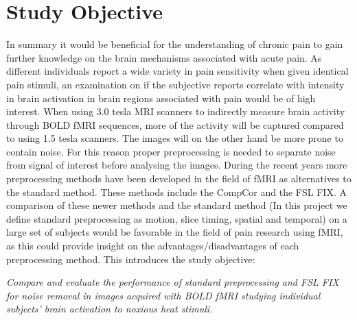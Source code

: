 \chapter{Study Objective}

In summary it would be beneficial for the understanding of chronic pain to gain further knowledge on the brain mechanisms associated with acute pain. As different individuals report a wide variety in pain sensitivity when given identical pain stimuli, an examination on if the subjective reports correlate with intensity in brain activation in brain regions associated with pain would be of high interest. When using 3.0 tesla MRI scanners to indirectly measure brain activity through BOLD fMRI sequences, more of the activity will be captured compared to using 1.5 tesla scanners. The images will on the other hand be more prone to contain noise. For this reason proper preprocessing is needed to separate noise from signal of interest before analysing the images. During the recent years more preprocessing methods have been developed in the field of fMRI as alternatives to the standard method. These methods include the CompCor and the FSL FIX. A comparison of these newer methods and the standard method (In this project we define standard preprocessing as motion, slice timing, spatial and temporal) on a large set of subjects would be favorable in the field of pain research using fMRI, as this could provide insight on the advantages/disadvantages of each preprocessing method. This introduces the study objective:

\begin{center}

\textit{Compare and evaluate the performance of standard preprocessing and FSL FIX for noise removal in images acquired with BOLD fMRI studying individual subjects' brain activation to noxious heat stimuli.}

\end{center}